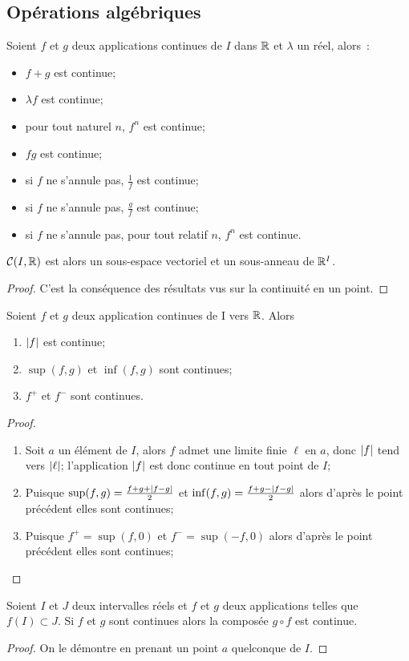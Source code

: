 \subsection{Opérations algébriques}

\begin{prop}
  Soient $f$ et $g$ deux applications continues de $I$ dans $\mathbb{R}$ et $\lambda$ un réel, alors~:
  \begin{itemize}
  \item $f+g$ est continue;
  \item $\lambda f$ est continue;
  \item pour tout naturel $n$, $f^n$ est continue;
  \item $fg$ est continue;
  \item si $f$ ne s'annule pas, $\frac{1}{f}$ est continue;
  \item si $f$ ne s'annule pas, $\frac{g}{f}$ est continue;
  \item si $f$ ne s'annule pas, pour tout relatif $n$, $f^n$ est continue.
  \end{itemize}
  $\mathcal{C}(I,\mathbb{R})$ est alors un sous-espace vectoriel et un sous-anneau de $\mathbb{R}^I$.
\end{prop}
\begin{proof}
  C'est la conséquence des résultats vus sur la continuité en un point.
\end{proof}
\begin{prop}
  Soient $f$ et $g$ deux application continues de I vers $\mathbb{R}$. Alors
  \begin{enumerate}
  \item $\left\lvert f\right\rvert$ est continue;
  \item $\sup(f,g)$ et $\inf(f,g)$ sont continues;
  \item $f^{+}$ et $f^{-}$ sont continues.
  \end{enumerate}
\end{prop}
\begin{proof}
  \begin{enumerate}
  \item Soit $a$ un élément de $I$, alors $f$ admet une limite finie $\ell$ en $a$, donc $\left\lvert f\right\rvert$ tend vers $\left\lvert\ell\right\rvert$; l'application $\left\lvert f\right\rvert$ est donc continue en tout point de $I$;
  \item Puisque $\sup(f,g)=\frac{f+g+\left\lvert f-g\right\rvert}{2}$ et $\inf(f,g)=\frac{f+g-\left\lvert f-g\right\rvert}{2}$ alors d'après le point précédent elles sont continues;
  \item Puisque $f^{+}=\sup(f,0)$ et $f^{-}=\sup(-f,0)$ alors d'après le point précédent elles sont continues;
  \end{enumerate}
\end{proof}
\begin{prop}
  Soient $I$ et $J$ deux intervalles réels et $f$ et $g$ deux applications telles que $f(I) \subset J$. Si $f$ et $g$ sont continues alors la composée $g \circ f$ est continue.
\end{prop}
\begin{proof}
  On le démontre en prenant un point $a$ quelconque de $I$.
\end{proof}

